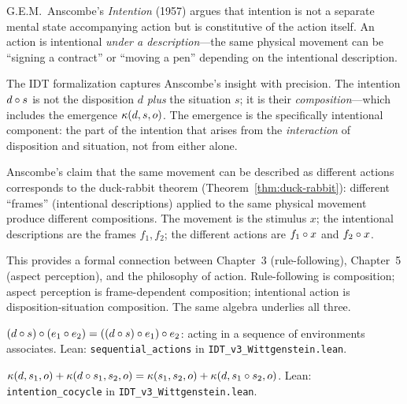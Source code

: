 \begin{interpretation}
G.E.M.~Anscombe's \textit{Intention} (1957) argues that intention is not a
separate mental state accompanying action but is constitutive of the action
itself. An action is intentional \emph{under a description}---the same physical
movement can be ``signing a contract'' or ``moving a pen'' depending on the
intentional description.

The IDT formalization captures Anscombe's insight with precision. The intention
$d \circ s$ is not the disposition $d$ \emph{plus} the situation $s$; it is
their \emph{composition}---which includes the emergence $\kappa(d, s, o)$.
The emergence is the specifically intentional component: the part of the intention
that arises from the \emph{interaction} of disposition and situation, not from
either alone.

Anscombe's claim that the same movement can be described as different actions
corresponds to the duck-rabbit theorem (Theorem~\ref{thm:duck-rabbit}):
different ``frames'' (intentional descriptions) applied to the same physical
movement produce different compositions. The movement is the stimulus $x$;
the intentional descriptions are the frames $f_1, f_2$; the different actions
are $f_1 \circ x$ and $f_2 \circ x$.

This provides a formal connection between Chapter~3 (rule-following), Chapter~5
(aspect perception), and the philosophy of action. Rule-following is composition;
aspect perception is frame-dependent composition; intentional action is
disposition-situation composition. The same algebra underlies all three.
\end{interpretation}

\begin{theorem}
\label{thm:sequential-actions}
$(d \circ s) \circ (e_1 \circ e_2) = ((d \circ s) \circ e_1) \circ e_2$:
acting in a sequence of environments associates.
Lean: \texttt{sequential\_actions} in \texttt{IDT\_v3\_Wittgenstein.lean}.
\end{theorem}

\begin{theorem}
\label{thm:intention-cocycle}
$\kappa(d, s_1, o) + \kappa(d \circ s_1, s_2, o)
= \kappa(s_1, s_2, o) + \kappa(d, s_1 \circ s_2, o)$.
Lean: \texttt{intention\_cocycle} in \texttt{IDT\_v3\_Wittgenstein.lean}.
\end{theorem}

